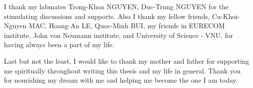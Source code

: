 \documentclass[13pt, oneside]{Thesis} %
\begin{document}
{{I thank my labmates Trong-Khoa NGUYEN, Duc-Trung NGUYEN for the stimulating discussions and supports. Also I thank my fellow friends, Cu-Khoi-Nguyen MAC, Hoang-An LE, Quoc-Minh BUI, my friends in EURECOM institute, John von Neumann institute, and University of Science - VNU, for having always been a part of my life.
	
Last but not the least, I would like to thank my mother and father for supporting me spiritually throughout writing this thesis and my life in general. Thank you for nourishing my dream with me and helping me become the one I am today.

}
\clearpage %


\pagestyle{fancy} %

\tableofcontents %

\listoffigures %

\listoftables %


\mainmatter %

\pagestyle{fancy} %



 

 
 
 
% 


}
\end{document}
